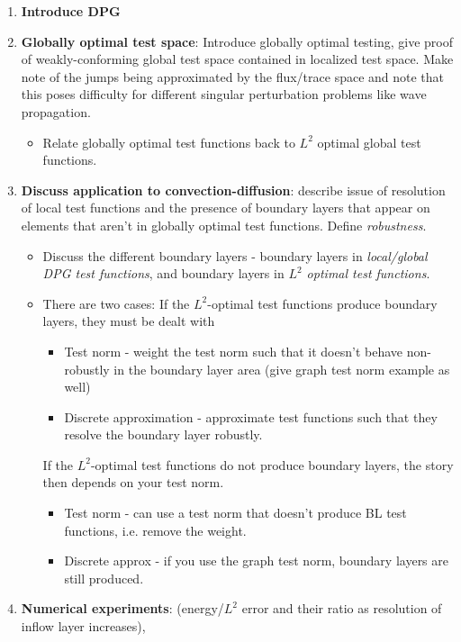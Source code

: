 \documentclass[11pt,onecolumn]{scrartcl}
\begin{document}
\begin{enumerate}
\item \textbf{Introduce DPG}
\item \textbf{Globally optimal test space}: Introduce globally optimal testing, give proof of weakly-conforming global test space contained in localized test space. Make note of the jumps being approximated by the flux/trace space and note that this poses difficulty for different singular perturbation problems like wave propagation.
\begin{itemize}
\item Relate globally optimal test functions back to $L^2$ optimal global test functions.  
\end{itemize}
\item \textbf{Discuss application to convection-diffusion}: describe issue of resolution of local test functions and the presence of boundary layers that appear on elements that aren't in globally optimal test functions.  Define \textit{robustness}.
\begin{itemize}
\item Discuss the different boundary layers - boundary layers in \textit{local/global DPG test functions}, and boundary layers in \textit{$L^2$ optimal test functions}.
\item There are two cases: If the $L^2$-optimal test functions produce boundary layers, they must be dealt with
\begin{itemize}
\item Test norm - weight the test norm such that it doesn't behave non-robustly in the boundary layer area (give graph test norm example as well)
\item Discrete approximation - approximate test functions such that they resolve the boundary layer robustly.  
\end{itemize}
If the $L^2$-optimal test functions do not produce boundary layers, the story then depends on your test norm.
\begin{itemize}
\item Test norm - can use a test norm that doesn't produce BL test functions, i.e. remove the weight.
\item Discrete approx - if you use the graph test norm, boundary layers are still produced.
\end{itemize}
\end{itemize}
\item \textbf{Numerical experiments}: (energy/$L^2$ error and their ratio as resolution of inflow layer increases), 

\end{enumerate}
\end{document}
